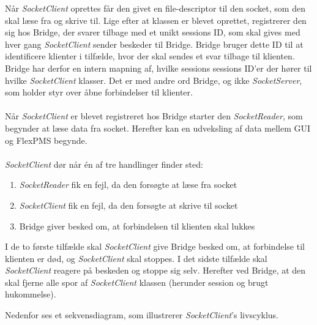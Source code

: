Når \textit{SocketClient} oprettes får den givet en file-descriptor til den socket, som den skal læse fra og skrive til. Lige efter at klassen er blevet oprettet, registrerer den sig hos Bridge, der svarer tilbage med et unikt sessions ID, som skal gives med hver gang \textit{SocketClient} sender beskeder til Bridge. Bridge bruger dette ID til at identificere klienter i tilfælde, hvor der skal sendes et svar tilbage til klienten. Bridge har derfor en intern mapning af, hvilke sessions sessions ID'er der hører til hvilke \textit{SocketClient} klasser. Det er med andre ord Bridge, og ikke \textit{SocketServer}, som holder styr over åbne forbindelser til klienter.\\\\

Når \textit{SocketClient} er blevet registreret hos Bridge starter den \textit{SocketReader}, som begynder at læse data fra socket. Herefter kan en udveksling af data mellem GUI og FlexPMS begynde.\\\\

\textit{SocketClient} dør når én af tre handlinger finder sted:

\begin{enumerate}
\item \textit{SocketReader} fik en fejl, da den forsøgte at læse fra socket
\item \textit{SocketClient} fik en fejl, da den forsøgte at skrive til socket
\item Bridge giver besked om, at forbindelsen til klienten skal lukkes 
\end{enumerate}

I de to første tilfælde skal \textit{SocketClient} give Bridge besked om, at forbindelse til klienten er død, og \textit{SocketClient} skal stoppes. I det sidste tilfælde skal \textit{SocketClient} reagere på beskeden og stoppe sig selv. Herefter ved Bridge, at den skal fjerne alle spor af \textit{SocketClient} klassen (herunder session og brugt hukommelse).


Nedenfor ses et sekvensdiagram, som illustrerer \textit{SocketClient}'s livscyklus.

